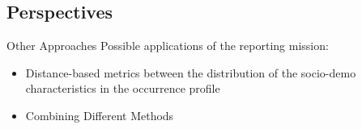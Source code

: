 \documentclass[pdf]{beamer}
\begin{document}
\subsection{Perspectives}

\begin{frame}{Other Approaches}
Possible applications of the reporting mission:
\begin{itemize}
\item{Distance-based metrics between the distribution of the socio-demo characteristics in the occurrence profile}
\item{Combining Different Methods}
\end{itemize}
\end{frame}
\end{document}

